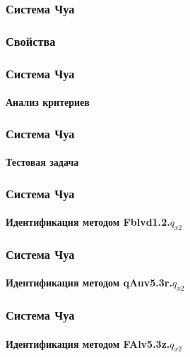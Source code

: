 \documentclass[10pt,utf8]{beamer}
\begin{document}

\begin{frame}
  \frametitle{Система Чуа}
  \frametitle{Свойства}


\end{frame}




\begin{frame}
  \frametitle{Система Чуа}
  \framesubtitle{Анализ критериев}


\end{frame}




\begin{frame}
  \frametitle{Система Чуа}
  \framesubtitle{Тестовая задача}


\end{frame}




\begin{frame}
  \frametitle{Система Чуа}
  \framesubtitle{Идентификация методом  Fblvd1.2.$q_{x2}$ }


\end{frame}




\begin{frame}
  \frametitle{Система Чуа}
  \framesubtitle{Идентификация методом qAuv5.3r.$q_{x2}$}


\end{frame}




\begin{frame}
  \frametitle{Система Чуа}
  \framesubtitle{Идентификация методом FAlv5.3z.$q_{x2}$}


\end{frame}



\end{document}
